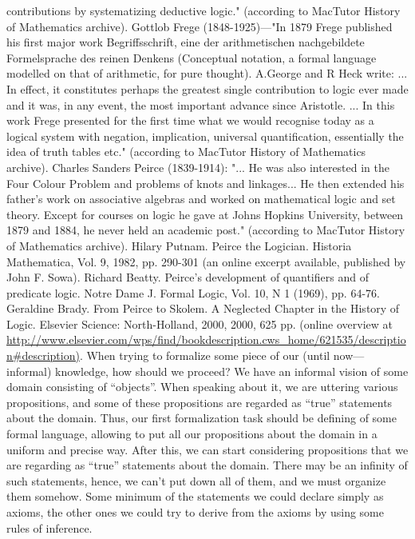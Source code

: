 contributions by systematizing deductive logic." (according to MacTutor History of Mathematics archive).
Gottlob Frege (1848-1925)---"In 1879 Frege published his first major work Begriffsschrift, eine der arithmetischen
nachgebildete Formelsprache des reinen Denkens (Conceptual notation, a formal language modelled on that of arithmetic, for
pure thought). A.George and R Heck write: ... In effect, it constitutes perhaps the greatest single contribution to logic ever
made and it was, in any event, the most important advance since Aristotle. ... In this work Frege presented for the first time
what we would recognise today as a logical system with negation, implication, universal quantification, essentially the idea of
truth tables etc." (according to MacTutor History of Mathematics archive).
Charles Sanders Peirce (1839-1914): "... He was also interested in the Four Colour Problem and problems of knots and
linkages... He then extended his father's work on associative algebras and worked on mathematical logic and set theory. Except
for courses on logic he gave at Johns Hopkins University, between 1879 and 1884, he never held an academic post."
(according to MacTutor History of Mathematics archive).
Hilary Putnam. Peirce the Logician. Historia Mathematica, Vol. 9, 1982, pp. 290-301 (an online excerpt available, published
by John F. Sowa).
Richard Beatty. Peirce's development of quantifiers and of predicate logic. Notre Dame J. Formal Logic, Vol. 10, N 1 (1969),
pp. 64-76.
Geraldine Brady. From Peirce to Skolem. A Neglected Chapter in the History of Logic. Elsevier Science: North-Holland, 2000,
2000, 625 pp. (online overview at
\url{http://www.elsevier.com/wps/find/bookdescription.cws\_home/621535/description#description)}.
When trying to formalize some piece of our (until now---informal) knowledge, how should we proceed?
We have an informal vision of some domain consisting of ``objects''. When speaking about it, we are
uttering various propositions, and some of these propositions are regarded as ``true'' statements about the
domain.
Thus, our first formalization task should be defining of some formal language, allowing to put all our
propositions about the domain in a uniform and precise way.
After this, we can start considering propositions that we are regarding as ``true'' statements about the
domain. There may be an infinity of such statements, hence, we can't put down all of them, and we must
organize them somehow. Some minimum of the statements we could declare simply as axioms, the other
ones we could try to derive from the axioms by using some rules of inference.
